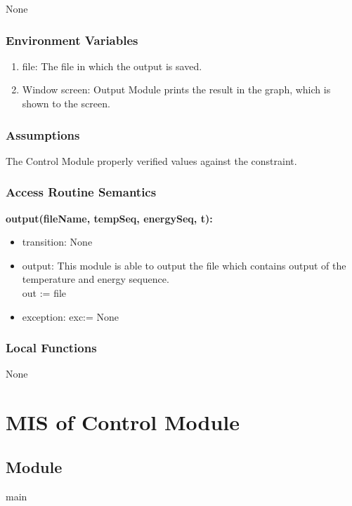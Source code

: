 \documentclass[12pt, titlepage]{article}
\begin{document}
None

\subsubsection{Environment Variables}

\begin{enumerate}
    \item file: The file in which the output is saved. 
    \item Window screen: Output Module prints the result in the graph, which is shown to the screen. 
\end{enumerate}


\subsubsection{Assumptions}

The Control Module properly verified values against the constraint.   

\subsubsection{Access Routine Semantics}

\noindent \textbf{output(fileName, tempSeq, energySeq, t):}
\begin{itemize}
\item transition: None 
\item output: This module is able to output the file which contains output of the temperature and energy sequence.\\  
out := file
\item exception: exc:= None 
\end{itemize}

\subsubsection{Local Functions}

None

\newpage
\section{MIS of Control Module} \label{SCEC_Control_Module} 

\subsection{Module}

main 
\end{document}
